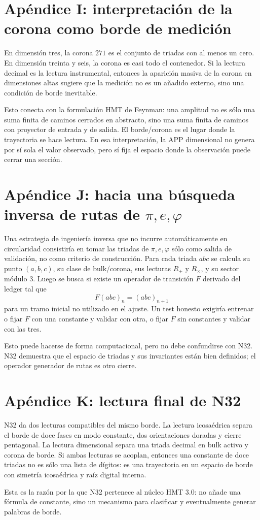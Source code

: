 \documentclass[11pt,a4paper]{article}
\begin{document}
\section{Apéndice I: interpretación de la corona como borde de medición}
En dimensión tres, la corona $271$ es el conjunto de triadas con al menos un cero. En dimensión treinta y seis, la corona es casi todo el contenedor. Si la lectura decimal es la lectura instrumental, entonces la aparición masiva de la corona en dimensiones altas sugiere que la medición no es un añadido externo, sino una condición de borde inevitable.

Esto conecta con la formulación HMT de Feynman: una amplitud no es sólo una suma finita de caminos cerrados en abstracto, sino una suma finita de caminos con proyector de entrada y de salida. El borde/corona es el lugar donde la trayectoria se hace lectura. En esa interpretación, la APP dimensional no genera por sí sola el valor observado, pero sí fija el espacio donde la observación puede cerrar una sección.

\section{Apéndice J: hacia una búsqueda inversa de rutas de $\pi,e,\varphi$}
Una estrategia de ingeniería inversa que no incurre automáticamente en circularidad consistiría en tomar las triadas de $\pi,e,\varphi$ sólo como salida de validación, no como criterio de construcción. Para cada triada $abc$ se calcula su punto $(a,b,c)$, su clase de bulk/corona, sus lecturas $R_+$ y $R_\times$, y su sector módulo $3$. Luego se busca si existe un operador de transición $F$ derivado del ledger tal que
\[
F(abc)_n=(abc)_{n+1}
\]
para un tramo inicial no utilizado en el ajuste. Un test honesto exigiría entrenar o fijar $F$ con una constante y validar con otra, o fijar $F$ sin constantes y validar con las tres.

Esto puede hacerse de forma computacional, pero no debe confundirse con N32. N32 demuestra que el espacio de triadas y sus invariantes están bien definidos; el operador generador de rutas es otro cierre.

\section{Apéndice K: lectura final de N32}
N32 da dos lecturas compatibles del mismo borde. La lectura icosaédrica separa el borde de doce fases en modo constante, dos orientaciones doradas y cierre pentagonal. La lectura dimensional separa una triada decimal en bulk activo y corona de borde. Si ambas lecturas se acoplan, entonces una constante de doce triadas no es sólo una lista de dígitos: es una trayectoria en un espacio de borde con simetría icosaédrica y raíz digital interna.

Esta es la razón por la que N32 pertenece al núcleo HMT 3.0: no añade una fórmula de constante, sino un mecanismo para clasificar y eventualmente generar palabras de borde.
\end{document}
